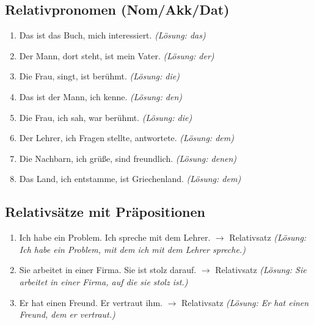 \subsection{Relativpronomen (Nom/Akk/Dat)}
\begin{enumerate}
    \item Das ist das Buch, \underline{\hspace{1cm}} mich interessiert. \quad \textit{(Lösung: das)}
    \item Der Mann, \underline{\hspace{1cm}} dort steht, ist mein Vater. \quad \textit{(Lösung: der)}
    \item Die Frau, \underline{\hspace{1cm}} singt, ist berühmt. \quad \textit{(Lösung: die)}
    \item Das ist der Mann, \underline{\hspace{1cm}} ich kenne. \quad \textit{(Lösung: den)}
    \item Die Frau, \underline{\hspace{1cm}} ich sah, war berühmt. \quad \textit{(Lösung: die)}
    \item Der Lehrer, \underline{\hspace{1cm}} ich Fragen stellte, antwortete. \quad \textit{(Lösung: dem)}
    \item Die Nachbarn, \underline{\hspace{1cm}} ich grüße, sind freundlich. \quad \textit{(Lösung: denen)}
    \item Das Land, \underline{\hspace{1cm}} ich entstamme, ist Griechenland. \quad \textit{(Lösung: dem)}
\end{enumerate}

\subsection{Relativsätze mit Präpositionen}
\begin{enumerate}
    \item Ich habe ein Problem. Ich spreche mit dem Lehrer. $\rightarrow$ Relativsatz \quad \textit{(Lösung: Ich habe ein Problem, mit dem ich mit dem Lehrer spreche.)}
    \item Sie arbeitet in einer Firma. Sie ist stolz darauf. $\rightarrow$ Relativsatz \quad \textit{(Lösung: Sie arbeitet in einer Firma, auf die sie stolz ist.)}
    \item Er hat einen Freund. Er vertraut ihm. $\rightarrow$ Relativsatz \quad \textit{(Lösung: Er hat einen Freund, dem er vertraut.)}
\end{enumerate}

\chapterend
